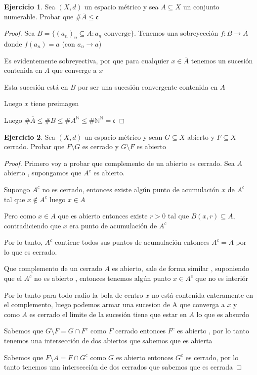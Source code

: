 \documentclass[12pt]{report}
\newcommand{\N}{\mathbb{N}}
\newcommand{\ra}{\rightarrow}
\newcommand{\ol}{\overline}
\theoremstyle{definition}
\newtheorem{ej}{Ejercicio}
\begin{document}
\begin{ej}
	Sea $(X,d)$ un espacio métrico y sea $A \subseteq X$ un conjunto numerable. Probar que $\# \ol A \leq \mathfrak{c}$
	\begin{proof}
		Sea $B = \{(a_n)_n \subseteq A : a_n \text{ converge} \}$. Tenemos una sobreyección $f : B \ra \ol A$ donde $f(a_n) = a$ (con $a_n \ra a$) 

		Es evidentemente sobreyectiva, por que para cualquier $x \in \ol A$ tenemos un sucesión contenida en $A$ que converge a $x$

		Esta sucesión está en $B$ por ser una sucesión convergente contenida en $A$ 

		Luego $x$ tiene preimagen

		Luego $\# \ol A \leq \# B \leq \# A^{\N} \leq \# \N^{\N} = \mathfrak{c} $
	\end{proof}
	
	
\end{ej}


\begin{ej}
  Sea $(X,d)$ un espacio métrico y sean $G \subseteq X$ abierto y $F \subseteq X$ cerrado. Probar que $F \setminus G$ es cerrado y $G \setminus F$ es abierto
  \begin{proof}

	  Primero voy a probar que complemento de un abierto es cerrado. Sea $A$ abierto , supongamos que $A^c$ es abierto. 

	  Supongo $A^c$ no es cerrado, entonces existe algún punto de acumulación $x$ de $A^c$ tal que $x \notin A^c$ luego $x \in A$

	  Pero como $x \in A$ que es abierto entonces existe $r>0$ tal que $B(x,r) \subseteq A$, contradiciendo que $x$ era punto de acumulación de $A^c$

	  Por lo tanto, $A^c$ contiene todos sus puntos de acumulación entonces $A^c = \ol A$ por lo que es cerrado.

	  Que complemento de un cerrado $A$ es abierto, sale de forma similar , suponiendo que el $A^c$ no es abierto , entonces tenemos algún punto $x \in A^c$ que no es interiór

	  Por lo tanto para todo radio la bola de centro $x$ no está contenida enteramente en el complemento, luego podemos armar una sucesion de A que converga a $x$ y como $A$ es cerrado el límite de la sucesión tiene que estar en $A$ lo que es absurdo

Sabemos que $G \setminus F = G \cap F^c$ como $F$ cerrado entonces $F^c$ es abierto , por lo tanto tenemos una intersección de dos abiertos que sabemos que es abierta

Sabemos que $F \setminus A = F \cap G^c$ como $G$ es abierto entonces $G^c$ es cerrado, por lo tanto tenemos una intersección de dos cerrados que sabemos que es cerrada

  \end{proof}
\end{ej}
\end{document}
